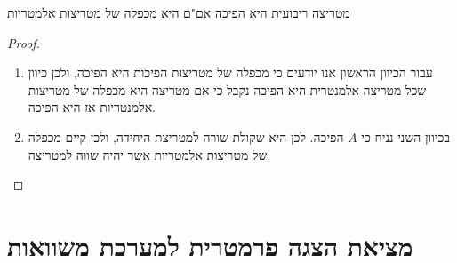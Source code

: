 \documentclass{tstextbook}
\begin{document}
\begin{proposition}
מטריצה ריבועית היא הפיכה אם"ם היא מכפלה של מטריצות אלמטריות

\end{proposition}
\begin{proof}
  \begin{enumerate}
    \item עבור הכיוון הראשון אנו יודעים כי מכפלה של מטריצות הפיכות היא הפיכה, ולכן כיוון שכל מטריצה אלמנטרית היא הפיכה נקבל כי אם מטריצה היא מכפלה של מטריצות אלמנטריות אז היא הפיכה. 


    \item בכיוון השני נניח כי \(A\) הפיכה. לכן היא שקולת שורה למטריצת היחידה, ולכן קיים מכפלה של מטריצות אלמטריות אשר יהיה שווה למטריצה. 


  \end{enumerate}
\end{proof}
\section{מציאת הצגה פרמטרית למערכת משוואות}
\end{document}
